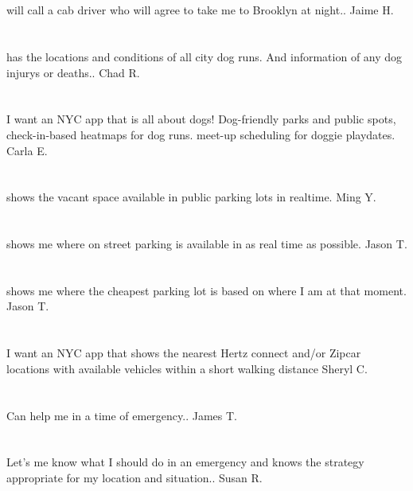 \section{}will call a cab driver who will agree to take me to Brooklyn at night.. Jaime H.
\section{}has the locations and conditions of all city dog runs. And information of any dog injurys  or deaths.. Chad R.
\section{}I want an NYC app that is all about dogs! Dog-friendly parks and public spots,  check-in-based heatmaps for dog runs.  meet-up scheduling for doggie playdates.  Carla E.
\section{} shows the vacant  space available in public parking lots in realtime. Ming Y.
\section{}shows me where on street parking is available in as real time as possible. Jason  T.
\section{}shows me where the cheapest parking lot is based on where I am at that moment. Jason  T.
\section{}I want an NYC app that shows the nearest Hertz connect and/or Zipcar locations with available vehicles within a short walking distance   Sheryl C.
\section{} Can help me in a time of emergency.. James T.
\section{} Let's me know what I should do in an emergency and knows the strategy appropriate for my location and situation.. Susan R.
